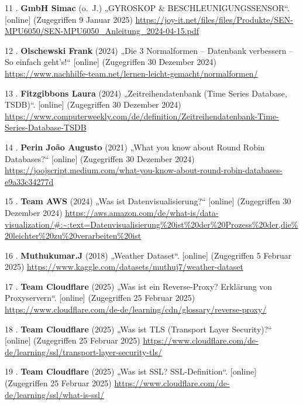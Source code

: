 \documentclass[
    headings=optiontotocandhead,%
    twoside,
    numbers=noenddot,%
    12pt, %
    titlepage, %
    parskip=full, %
    listof=leveldown, 
    numbers=noenddot, %
    a4paper,DIV=14,
    BCOR=15mm,
]{scrbook}
\newlength{\cslhangindent}
\newenvironment{cslreferences}%
  {\setlength{\parindent}{0pt}%
  \everypar{\setlength{\hangindent}{\cslhangindent}}\ignorespaces}%
  {\par}
\begin{document}
\begin{cslreferences}
\leavevmode\hypertarget{ref-MPU6050-Datenblatt}{}%
11 . \textbf{GmbH Simac} (o.~J.) „GYROSKOP \& BESCHLEUNIGUNGSSENSOR``.
{[}online{]} (Zugegriffen 9 Januar 2025)
\url{https://joy-it.net/files/files/Produkte/SEN-MPU6050/SEN-MPU6050_Anleitung_2024-04-15.pdf}

\leavevmode\hypertarget{ref-Nachhilfe-Team}{}%
12 . \textbf{Olschewski Frank} (2024) „Die 3 Normalformen -- Datenbank
verbessern -- So einfach geht's!{}`` {[}online{]} (Zugegriffen 30
Dezember 2024)
\url{https://www.nachhilfe-team.net/lernen-leicht-gemacht/normalformen/}

\leavevmode\hypertarget{ref-Computerweekly}{}%
13 . \textbf{Fitzgibbons Laura} (2024) „Zeitreihendatenbank (Time Series
Database, TSDB)``. {[}online{]} (Zugegriffen 30 Dezember 2024)
\url{https://www.computerweekly.com/de/definition/Zeitreihendatenbank-Time-Series-Database-TSDB}

\leavevmode\hypertarget{ref-joojscript}{}%
14 . \textbf{Perin João Augusto} (2021) „What you know about Round Robin
Databases?{}`` {[}online{]} (Zugegriffen 30 Dezember 2024)
\url{https://joojscript.medium.com/what-you-know-about-round-robin-databases-e9a33c34277d}

\leavevmode\hypertarget{ref-aws-datenvisualisierung}{}%
15 . \textbf{Team AWS} (2024) „Was ist Datenvisualisierung?{}``
{[}online{]} (Zugegriffen 30 Dezember 2024)
\url{https://aws.amazon.com/de/what-is/data-visualization/\#:~:text=Datenvisualisierung\%20ist\%20der\%20Prozess\%20der,die\%20leichter\%20zu\%20verarbeiten\%20ist}

\leavevmode\hypertarget{ref-kaggle-weather-data}{}%
16 . \textbf{Muthukumar.J} (2018) „Weather Dataset``. {[}online{]}
(Zugegriffen 5 Februar 2025)
\url{https://www.kaggle.com/datasets/muthuj7/weather-dataset}

\leavevmode\hypertarget{ref-reverse-proxy}{}%
17 . \textbf{Team Cloudflare} (2025) „Was ist ein Reverse-Proxy?
\textbar{} Erklärung von Proxyservern``. {[}online{]} (Zugegriffen 25
Februar 2025)
\url{https://www.cloudflare.com/de-de/learning/cdn/glossary/reverse-proxy/}

\leavevmode\hypertarget{ref-tls}{}%
18 . \textbf{Team Cloudflare} (2025) „Was ist TLS (Transport Layer
Security)?{}`` {[}online{]} (Zugegriffen 25 Februar 2025)
\url{https://www.cloudflare.com/de-de/learning/ssl/transport-layer-security-tls/}

\leavevmode\hypertarget{ref-ssl}{}%
19 . \textbf{Team Cloudflare} (2025) „Was ist SSL? \textbar{}
SSL-Definition``. {[}online{]} (Zugegriffen 25 Februar 2025)
\url{https://www.cloudflare.com/de-de/learning/ssl/what-is-ssl/}


\end{cslreferences}
\end{document}
